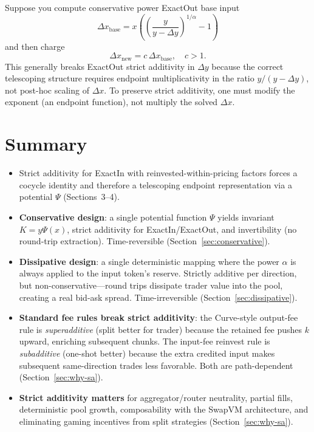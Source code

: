 \documentclass[11pt]{article}
\theoremstyle{definition}
\theoremstyle{remark}
\newcommand{\dx}{\Delta x}
\newcommand{\dy}{\Delta y}
\begin{document}
Suppose you compute conservative power ExactOut base input
\[
\dx_{\mathrm{base}}=x\left(\left(\frac{y}{y-\dy}\right)^{1/\alpha}-1\right)
\]
and then charge
\[
\dx_{\mathrm{new}} = c\,\dx_{\mathrm{base}},\quad c>1.
\]
This generally breaks ExactOut strict additivity in $\dy$ because the correct telescoping structure requires endpoint multiplicativity in the ratio $y/(y-\dy)$, not post-hoc scaling of $\dx$.
To preserve strict additivity, one must modify the exponent (an endpoint function), not multiply the solved $\dx$.

\section{Summary}\label{sec:summary}

\begin{itemize}[leftmargin=2em]
\item Strict additivity for ExactIn with reinvested-within-pricing factors forces a cocycle identity and therefore a telescoping endpoint representation via a potential $\Psi$ (Sections~3--4).

\item \textbf{Conservative design}: a single potential function $\Psi$ yields invariant $K=y\Psi(x)$, strict additivity for ExactIn/ExactOut, and invertibility (no round-trip extraction). Time-reversible (Section~\ref{sec:conservative}).

\item \textbf{Dissipative design}: a single deterministic mapping where the power $\alpha$ is always applied to the input token's reserve. Strictly additive per direction, but non-conservative---round trips dissipate trader value into the pool, creating a real bid-ask spread. Time-irreversible (Section~\ref{sec:dissipative}).

\item \textbf{Standard fee rules break strict additivity}: the Curve-style output-fee rule is \emph{superadditive} (split better for trader) because the retained fee pushes $k$ upward, enriching subsequent chunks. The input-fee reinvest rule is \emph{subadditive} (one-shot better) because the extra credited input makes subsequent same-direction trades less favorable. Both are path-dependent (Section~\ref{sec:why-sa}).

\item \textbf{Strict additivity matters} for aggregator/router neutrality, partial fills, deterministic pool growth, composability with the SwapVM architecture, and eliminating gaming incentives from split strategies (Section~\ref{sec:why-sa}).


\end{itemize}
\end{document}
